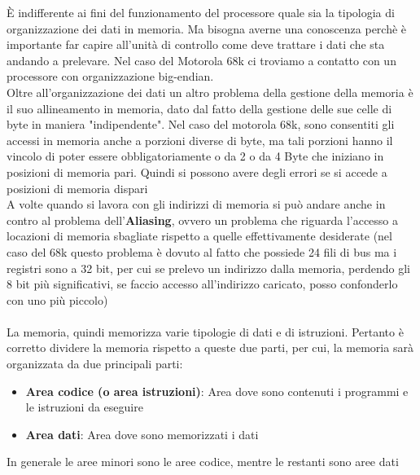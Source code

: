 \MakeUppercase{è} indifferente ai fini del funzionamento del processore quale sia la tipologia di organizzazione dei dati in memoria. Ma bisogna averne una conoscenza perchè è importante far capire all'unità di controllo come deve trattare i dati che sta andando a prelevare. Nel caso del Motorola 68k ci troviamo a contatto con un processore con organizzazione big-endian.
\\
Oltre all'organizzazione dei dati un altro problema della gestione della memoria è il suo allineamento in memoria, dato dal fatto della gestione delle sue celle di byte in maniera "indipendente".
Nel caso del motorola 68k, sono consentiti gli accessi in memoria anche a porzioni diverse di byte, ma tali porzioni hanno il vincolo di poter essere obbligatoriamente o da 2 o da 4 Byte che iniziano in posizioni di memoria pari. Quindi si possono avere degli errori se si accede a posizioni di memoria dispari
\\
A volte quando si lavora con gli indirizzi di memoria si può andare anche in contro al problema dell'\textbf{Aliasing}, ovvero un problema che riguarda l'accesso a locazioni di memoria sbagliate rispetto a quelle effettivamente desiderate (nel caso del 68k questo problema è dovuto al fatto che possiede 24 fili di bus ma i registri sono a 32 bit, per cui se prelevo un indirizzo dalla memoria, perdendo gli 8 bit più significativi, se faccio accesso all'indirizzo caricato, posso confonderlo con uno più piccolo)
\\
\\
La memoria, quindi memorizza varie tipologie di dati e di istruzioni. Pertanto è corretto dividere la memoria rispetto a queste due parti, per cui, la memoria sarà organizzata da due principali parti:

\begin{itemize}
    \item \textbf{Area codice (o area istruzioni)}: Area dove sono contenuti i programmi e le istruzioni da eseguire
    \item \textbf{Area dati}: Area dove sono memorizzati i dati
\end{itemize}

In generale le aree minori sono le aree codice, mentre le restanti sono aree dati

